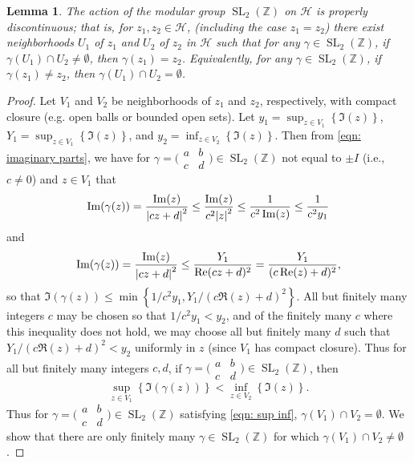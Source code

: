 \documentclass[10pt,leqno,twoside]{article}
\theoremstyle{plain}
\newtheorem{lemma}[lem]{Lemma}
\theoremstyle{definition}
\numberwithin{equation}{section}
\numberwithin{lem}{section}
\newcommand{\cbr}[1]{\left\{#1\right\}}
\DeclareMathOperator{\SL}{SL}
\newcommand{\slz}{\SL_2(\mathbb{Z})}
\begin{document}
\begin{lemma}
    The action of the modular group $\slz$ on $\mathcal H$ is properly discontinuous; that is, for $z_1,z_2\in \mathcal H$, (including the case $z_1 = z_2$) there exist neighborhoods $U_1$ of $z_1$ and $U_2$ of $z_2$ in $\mathcal H$ such that for any $\gamma\in \slz$, if $\gamma(U_1)\cap U_2\neq \emptyset$, then $\gamma(z_1) = z_2$. Equivalently, for any $\gamma\in\slz$, if $\gamma(z_1)\neq z_2$, then $\gamma(U_1)\cap U_2= \emptyset$.
\end{lemma}
\begin{proof}
    Let $V_1$ and $V_2$ be neighborhoods of $z_1$ and $z_2$, respectively, with compact closure (e.g. open balls or bounded open sets). Let $y_1 = \sup_{z\in V_1}\cbr{\Im(z)}$, $Y_1 = \sup_{z\in V_1}\cbr{\Im(z)}$, and $y_2 = \inf_{z\in V_2}\cbr{\Im(z)}$. Then from \cref{eqn: imaginary parts}, we have for $\gamma = \big(\!\begin{smallmatrix}
        a & b \\ c & d
    \end{smallmatrix}\!\big)\in \slz$ not equal to $\pm I$ (i.e., $c\neq 0$) and $z\in V_1$ that \[\Im(\gamma(z)) = \frac{\Im(z)}{\abs{cz+d}^2}\leq \frac{\Im(z)}{c^2\abs{z}^2}\leq \frac{1}{c^2\Im(z)}\leq \frac{1}{c^2y_1}\] and \[\Im(\gamma(z)) = \frac{\Im(z)}{\abs{cz+d}^2}\leq \frac{Y_1}{\Re(cz+d)^2} = \frac{Y_1}{(c\Re(z)+d)^2},\] so that $\Im(\gamma(z))\leq\min\cbr{1/c^2y_1,Y_1/(c\Re(z)+d)^2}$. All but finitely many integers $c$ may be chosen so that $1/c^2y_1< y_2$, and of the finitely many $c$ where this inequality does not hold, we may choose all but finitely many $d$ such that $Y_1/(c\Re(z)+d)^2< y_2$ uniformly in $z$ (since $V_1$ has compact closure). Thus for all but finitely many integers $c,d$, if $\gamma  = \big(\!\begin{smallmatrix}
        a & b \\ c & d
    \end{smallmatrix}\!\big)\in \slz$, then \begin{equation}\label{eqn: sup inf}
        \sup_{z\in V_1}\cbr{\Im(\gamma(z))}< \inf_{z\in V_2}\cbr{\Im(z)}.
    \end{equation} Thus for $\gamma = \big(\!\begin{smallmatrix}
        a & b \\ c & d
    \end{smallmatrix}\!\big)\in \slz$ satisfying \cref{eqn: sup inf}, $\gamma(V_1)\cap V_2=\emptyset$. We show that there are only finitely many $\gamma\in \slz$ for which $\gamma(V_1)\cap V_2\neq\emptyset$.


\end{proof}
\end{document}
